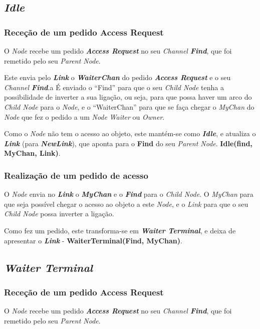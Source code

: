 \subsection*{\emph{Idle}}
\label{especificacao:nodes:idle}


\subsubsection*{Receção de um pedido Access Request}
O \emph{Node} recebe um pedido \emph{\textbf{Access Request}} no seu \emph{Channel \textbf{Find}}, que foi remetido pelo seu \emph{Parent Node}.

Este envia pelo \textbf{\emph{Link}} o \textbf{\emph{WaiterChan}} do pedido \emph{\textbf{Access Request}} e o seu \emph{Channel \textbf{Find}}.a
É enviado o ``Find'' para que o seu \emph{Child Node} tenha a possibilidade de inverter a sua ligação, ou seja, para que possa haver um arco do \emph{Child Node} para o \emph{Node}, 
e o ``WaiterChan'' para que se faça chegar o \emph{MyChan} do \emph{Node} que fez o pedido a um \emph{Node} \emph{Waiter} ou \emph{Owner}.

Como o \emph{Node} não tem o acesso ao objeto, este mantém-se como \emph{\textbf{Idle}}, e atualiza o \textbf{\emph{Link}} (para \textbf{\emph{NewLink}}), que aponta para o \textbf{Find} do seu \emph{Parent Node}.
\textbf{Idle(find, MyChan, Link)}.



\subsubsection*{Realização de um pedido de acesso}
O \emph{Node} envia no \textbf{\emph{Link}} o \textbf{\emph{MyChan}} e o \textbf{\emph{Find}} para o \emph{Child Node}.
O \emph{MyChan} para que seja possível chegar o acesso ao objeto a este \emph{Node}, e o \emph{Link} para que o seu \emph{Child Node} possa inverter a ligação.

Como fez um pedido, este transforma-se em \emph{\textbf{Waiter Terminal}}, e deixa de apresentar o \textbf{\emph{Link}} - \textbf{WaiterTerminal(Find, MyChan)}.

\subsection*{\emph{Waiter Terminal}}
\label{especificacao:nodes:waiter_terminal}


\subsubsection*{Receção de um pedido Access Request}
O \emph{Node} recebe um pedido \emph{\textbf{Access Request}} no seu \emph{Channel \textbf{Find}}, que foi remetido pelo seu \emph{Parent Node}.

